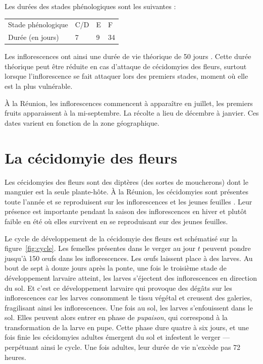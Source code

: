 Les durées des stades phénologiques sont les suivantes :
\begin{center}
\begin{tabular}{llll}
Stade phénologique & C/D & E & F\\
Durée (en jours) & 7 & 9 & 34
\end{tabular}
\end{center}
Les inflorescences ont ainsi une durée de vie théorique de 50 jours \citep{laurie}.
Cette durée théorique peut être réduite en cas d'attaque de cécidomyies des fleurs, surtout lorsque l'inflorescence se fait attaquer lors des premiers stades, moment où elle est la plus vulnérable.


À la Réunion, les inflorescences commencent à apparaître en juillet, les premiers fruits apparaissent à la mi-septembre. 
La récolte a lieu de décembre à janvier.
Ces dates varient en fonction de la zone géographique.






\section{La cécidomyie des fleurs}
\label{chap:cecido}

Les cécidomyies des fleurs sont des diptères (des sortes de moucherons) dont le manguier est la seule plante-hôte.
À la Réunion, les cécidomyies sont présentes toute l'année et se reproduisent sur les inflorescences et les jeunes feuilles \citep{paul}.
Leur présence est importante pendant la saison des inflorescences en hiver et plutôt faible en été où elles survivent en se reproduisant sur des jeunes feuilles.


Le cycle de développement de la cécidomyie des fleurs est schématisé sur la figure~\ref{fig:cycle}.
Les femelles présentes dans le verger au jour $t$ peuvent pondre jusqu'à 150 œufs dans les inflorescences.
Les œufs laissent place à des larves.
Au bout de sept à douze jours après la ponte, une fois le troisième stade de développement larvaire atteint, les larves s'éjectent des inflorescences en direction du sol.
Et c'est ce développement larvaire qui provoque des dégâts sur les inflorescences car les larves consomment le tissu végétal et creusent des galeries, fragilisant ainsi les inflorescences.
Une fois au sol, les larves s'enfouissent dans le sol. 
Elles peuvent alors entrer en phase de \emph{pupaison}, qui correspond à la transformation de la larve en pupe.
Cette phase dure quatre à six jours, et une fois finie les cécidomyies adultes émergent du sol et infestent le verger --- perpétuant ainsi le cycle. 
Une fois adultes, leur durée de vie n'excède pas 72 heures.

